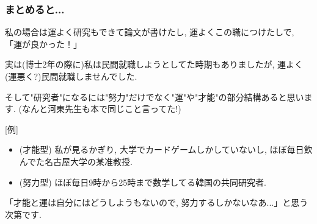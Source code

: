 \documentclass[11pt,dvipdfmx]{beamer}
\theoremstyle{definition}
\theoremstyle{remark}
\begin{document}
  \begin{frame} 
 \frametitle{まとめると...}
 
 \begin{block}{}
 \begin{center}
 私の場合は運よく研究もできて論文が書けたし, 運よくこの職につけたしで, 「運が良かった！」
 \end{center}
 \end{block}

実は(博士2年の際に)私は民間就職しようとしてた時期もありましたが, 運よく(運悪く?)民間就職しませんでした. 




\pause 
\vspace{11pt}
そして"研究者"になるには"努力"だけでなく"運"や"才能"の部分結構あると思います.
(なんと河東先生も本で同じこと言ってた!)

[例]
\begin{itemize}
\item (才能型) 私が見るかぎり, 大学でカードゲームしかしていないし, ほぼ毎日飲んでた名古屋大学の某准教授.
\item (努力型) ほぼ毎日9時から25時まで数学してる韓国の共同研究者.
\end{itemize}

「才能と運は自分にはどうしようもないので, 努力するしかないなあ...」と思う次第です. 

 



\end{frame}
\end{document}
